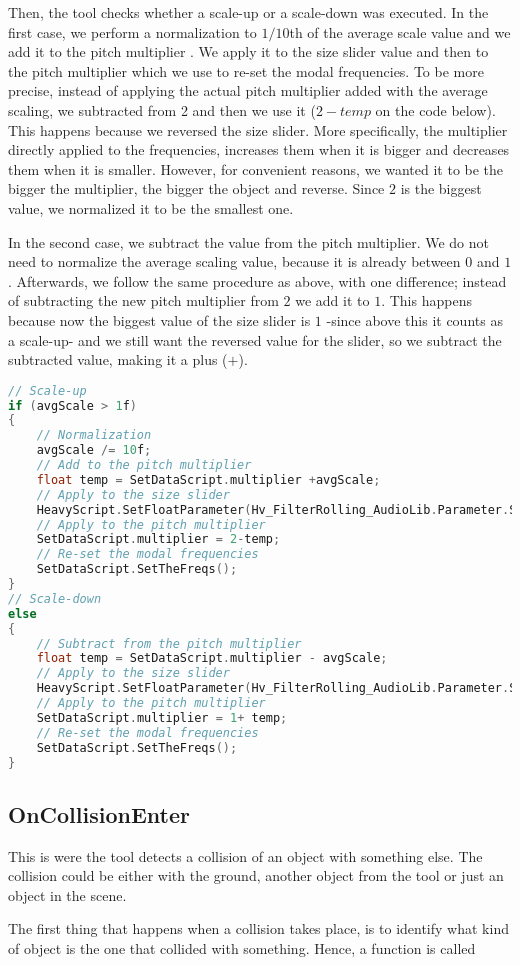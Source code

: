 Then, the tool checks whether a scale-up or a scale-down was executed. In the first case, we perform a normalization to $1/10$th of the average scale value and we add it to the pitch multiplier . We apply it to the size slider value and then to the pitch multiplier which we use to re-set the modal frequencies. To be more precise, instead of applying the actual pitch multiplier added with the average scaling, we subtracted from 2 and then we use it ($2-temp$ on the code below). This happens because we reversed the size slider. More specifically, the multiplier directly applied to the frequencies, increases them when it is bigger and decreases them when it is smaller. However, for convenient reasons, we wanted it to be the bigger the multiplier, the bigger the object and reverse. Since $2$ is the biggest value, we normalized it to be the smallest one.

In the second case, we subtract the value from the pitch multiplier. We do not need to normalize the average scaling value, because it is already between $0$ and $1$. Afterwards, we follow the same procedure as above, with one difference; instead of subtracting the new pitch multiplier from $2$ we add it to $1$. This happens because now the biggest value of the size slider is $1$ -since above this it counts as a scale-up- and we still want the reversed value for the slider, so we subtract the subtracted value, making it a plus ($+$).



\begin{lstlisting}[language=C]
// Scale-up
if (avgScale > 1f)
{
	// Normalization
    avgScale /= 10f;
    // Add to the pitch multiplier
    float temp = SetDataScript.multiplier +avgScale;
    // Apply to the size slider
    HeavyScript.SetFloatParameter(Hv_FilterRolling_AudioLib.Parameter.Size, 2-temp);
    // Apply to the pitch multiplier
    SetDataScript.multiplier = 2-temp;
    // Re-set the modal frequencies
    SetDataScript.SetTheFreqs();
}
// Scale-down
else
{
	// Subtract from the pitch multiplier
    float temp = SetDataScript.multiplier - avgScale;
    // Apply to the size slider
    HeavyScript.SetFloatParameter(Hv_FilterRolling_AudioLib.Parameter.Size, 1 + temp);
    // Apply to the pitch multiplier
    SetDataScript.multiplier = 1+ temp;
    // Re-set the modal frequencies
    SetDataScript.SetTheFreqs();
}
\end{lstlisting}



\subsection{OnCollisionEnter}
This is were the tool detects a collision of an object with something else. The collision could be either with the ground, another object from the tool or just an object in the scene.

The first thing that happens when a collision takes place, is to identify what kind of object is the one that collided with something. Hence, a function is called



